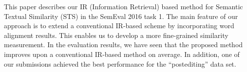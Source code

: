 This paper describes our IR (Information Retrieval) based method for Semantic Textual Similarity (STS) in the SemEval 2016 task 1. The main feature of our approach is to extend a conventional IR-based scheme by incorporating word alignment results. This enables us to develop a more fine-grained similarity measurement. In the evaluation results, we have seen that the proposed method improves upon a conventional IR-based method on average. In addition, one of our submissions achieved the best performance for the ``postediting'' data set.
